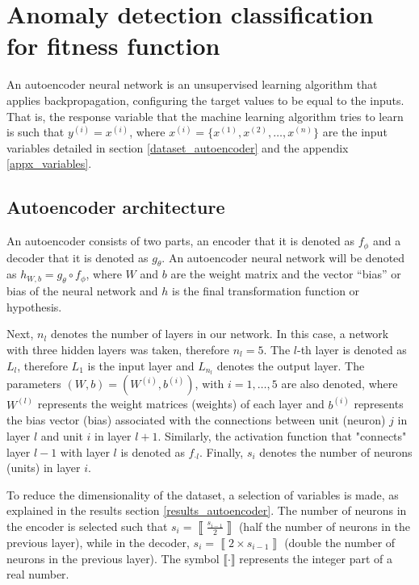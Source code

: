 \documentclass{iosart2c}
\begin{document}
\section{Anomaly detection classification for fitness function}\label{autoencoder_section}

An autoencoder neural network is an unsupervised learning algorithm that applies backpropagation, configuring the target values to be equal to the inputs. That is, the response variable that the machine learning algorithm tries to learn is such that $y^{(i)} = x^{(i)} $, where $x^{(i)} = \{x^{(1)}, x^{(2)}, \ldots, x^{(n)} \} $ are the input variables detailed in section \ref{dataset_autoencoder} and the appendix \ref{appx_variables}.\\

\subsection{Autoencoder architecture}\label{autoencoder_architecture}

An autoencoder consists of two parts, an encoder that it is denoted as $ f_{\phi} $ and a decoder that it is denoted as $ g_{\theta} $. An autoencoder neural network will be denoted as $ h_{W, b} = g_\theta \circ f_\phi$, where $W$ and $b$ are the weight matrix and the vector ``bias'' or bias of the neural network and $h$ is the final transformation function or hypothesis. 

Next, $n_l$ denotes the number of layers in our network.
In this case, a network with three hidden layers was taken, therefore $n_l=5$. The $l$-th layer is denoted as $L_l$, therefore $L_1$ is the input layer and $L_{n_l}$ denotes the output layer. The parameters $(W,b)=(W^{(i)},b^{(i)})$, with $i=1,\ldots,5$ are also denoted, where $W^{(l)}$ represents the weight matrices (weights) of each layer and $b^{(i)}$ represents the bias vector (bias) associated with the connections between unit (neuron) $j$ in layer $l$ and unit $i$ in layer $l+1$. Similarly, the activation function that "connects" layer $l-1$ with layer $l$ is denoted as $f_{\cdot l}$. Finally, $s_i$ denotes the number of neurons (units) in layer $i$.
 
To reduce the dimensionality of the dataset, a selection of variables is made, as explained in the results section \ref{results_autoencoder}. The number of neurons in the encoder is selected such that $s_i=\left\llbracket\frac{s_{i-1}}{2}\right\rrbracket$ (half the number of neurons in the previous layer), while in the decoder, $s_i=\left\llbracket 2\times s_{i-1} \right\rrbracket$ (double the number of neurons in the previous layer). The symbol $\llbracket \cdot \rrbracket$ represents the integer part of a real number.
\end{document}
